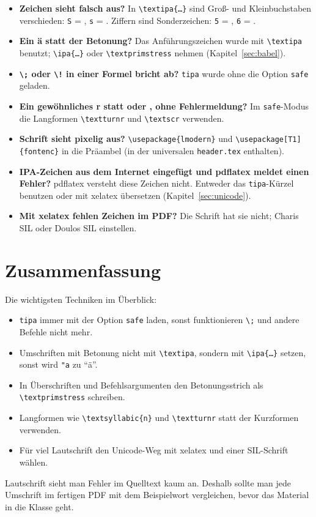\begin{itemize}
	\item \textbf{Zeichen sieht falsch aus?} In \texttt{\textbackslash textipa\{\dots\}} sind Groß- und Kleinbuchstaben verschieden: \texttt{S} = , \texttt{s} = . Ziffern sind Sonderzeichen: \texttt{5} = , \texttt{6} = .
	\item \textbf{Ein ä statt der Betonung?} Das Anführungszeichen wurde mit \texttt{\textbackslash textipa} benutzt; \texttt{\textbackslash ipa\{\dots\}} oder \texttt{\textbackslash textprimstress} nehmen (Kapitel~\ref{sec:babel}).
	\item \textbf{\texttt{\textbackslash;} oder \texttt{\textbackslash!} in einer Formel bricht ab?} \texttt{tipa} wurde ohne die Option \texttt{safe} geladen.
	\item \textbf{Ein gewöhnliches r statt \textipa{\textturnr} oder \textipa{\textscr}, ohne Fehlermeldung?} Im \texttt{safe}-Modus die Langformen \texttt{\textbackslash textturnr} und \texttt{\textbackslash textscr} verwenden.
	\item \textbf{Schrift sieht pixelig aus?} \texttt{\textbackslash usepackage\{lmodern\}} und \texttt{\textbackslash usepackage[T1]\{fontenc\}} in die Präambel (in der universalen \texttt{header.tex} enthalten).
	\item \textbf{IPA-Zeichen aus dem Internet eingefügt und pdflatex meldet einen Fehler?} pdflatex versteht diese Zeichen nicht. Entweder das \texttt{tipa}-Kürzel benutzen oder mit xelatex übersetzen (Kapitel~\ref{sec:unicode}).
	\item \textbf{Mit xelatex fehlen Zeichen im PDF?} Die Schrift hat sie nicht; Charis SIL oder Doulos SIL einstellen.
\end{itemize}



\section{Zusammenfassung}

Die wichtigsten Techniken im Überblick:

\begin{itemize}
	\item \texttt{tipa} immer mit der Option \texttt{safe} laden, sonst funktionieren \texttt{\textbackslash;} und andere Befehle nicht mehr.
	\item Umschriften mit Betonung nicht mit \texttt{\textbackslash textipa}, sondern mit \texttt{\textbackslash ipa\{\dots\}} setzen, sonst wird \texttt{"a} zu \enquote{ä}.
	\item In Überschriften und Befehlsargumenten den Betonungsstrich als \texttt{\textbackslash textprimstress} schreiben.
	\item Langformen wie \texttt{\textbackslash textsyllabic\{n\}} und \texttt{\textbackslash textturnr} statt der Kurzformen verwenden.
	\item Für viel Lautschrift den Unicode-Weg mit xelatex und einer SIL-Schrift wählen.
\end{itemize}

Lautschrift sieht man Fehler im Quelltext kaum an. Deshalb sollte man jede Umschrift im fertigen PDF mit dem Beispielwort vergleichen, bevor das Material in die Klasse geht.


